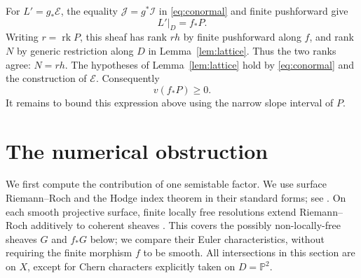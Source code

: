 \documentclass[11pt]{article}
\theoremstyle{remark}
\newcommand{\PP}{\mathbb P}
\newcommand{\cE}{\mathcal E}
\newcommand{\cI}{\mathcal I}
\newcommand{\cJ}{\mathcal J}
\DeclareMathOperator{\rk}{rk}
\begin{document}
For $L'=g_*\cE$, the equality $\cJ=g^*\cI$ in
\eqref{eq:conormal} and finite pushforward give
\[
 L'|_D=f_*P.
\]
Writing $r=\rk P$, this sheaf has rank $rh$ by finite pushforward
along $f$, and rank $N$ by generic restriction along $D$ in
Lemma~\ref{lem:lattice}. Thus the two ranks agree: $N=rh$.
The hypotheses of Lemma~\ref{lem:lattice} hold by
\eqref{eq:conormal} and the construction of $\cE$.
Consequently
\begin{equation}\label{eq:lower}
 v(f_*P)\geq0.
\end{equation}
It remains to bound this expression above using the narrow slope
interval of $P$.

\section{The numerical obstruction}\label{sec:numerical}
We first compute the contribution of one semistable factor.
We use surface Riemann--Roch and the Hodge index theorem in their
standard forms; see \cite[Appendix A, Theorem 4.1 and Example 4.1.2;
Chapter V, Theorem 1.9]{Hartshorne}.
On each smooth projective surface, finite locally free resolutions
extend Riemann--Roch additively to coherent sheaves
\cite[Appendix~A, Section~5]{Hartshorne}. This covers the possibly
non-locally-free sheaves $G$ and $f_*G$ below; we compare their Euler
characteristics, without requiring the finite morphism $f$ to be smooth.
All intersections in this section are on $X$, except for Chern
characters explicitly taken on $D=\PP^2$.
\end{document}
